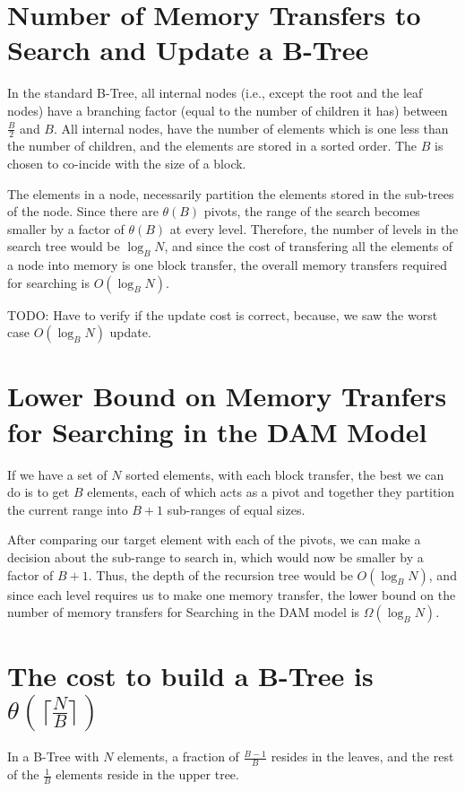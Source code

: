 \documentclass{article}
\begin{document}

\section {Number of Memory Transfers to Search and Update a B-Tree}
In the standard B-Tree, all internal nodes (i.e., except the root and 
the leaf nodes) have a branching factor (equal to the number of children it has) 
between $\frac{B}{2}$ and $B$. All internal nodes, have the number of
elements which is one less than the number of children, and the elements
are stored in a sorted order. The $B$ is chosen to co-incide with the size of
a block.

The elements in a node, necessarily partition
the elements stored in the sub-trees of the node. Since there are $\theta(B)$
pivots, the range of the search becomes smaller by a factor of $\theta(B)$ at
every level. Therefore, the number of levels in the search tree would be 
$\log_B{N}$, and since the cost of transfering all the elements of a node into
memory is one block transfer, the overall memory transfers required for searching
is $O(\log_B{N})$.

TODO: Have to verify if the update cost is correct, because, we saw the worst
case $O(\log_B{N})$ update.

\clearpage 

\section {Lower Bound on Memory Tranfers for Searching in the DAM Model}
If we have a set of $N$ sorted elements, with each block transfer, the best we can
do is to get $B$ elements, each of which acts as a pivot and together they partition
the current range into $B+1$ sub-ranges of equal sizes. 

After comparing our target element with each of the pivots, we can make a decision
about the sub-range to search in, which would now be smaller by a factor of $B+1$.
Thus, the depth of the recursion tree would be $O(\log_B{N})$, and since each level
requires us to make one memory transfer, the lower bound on the number of memory
transfers for Searching in the DAM model is $\Omega(\log_B{N})$.

\clearpage

\section {The cost to build a B-Tree is $\theta(\lceil\frac{N}{B}\rceil)$}
In a B-Tree with $N$ elements, a fraction of $\frac{B-1}{B}$ resides in the leaves, and
the rest of the $\frac{1}{B}$ elements reside in the upper tree. 
\end{document}
